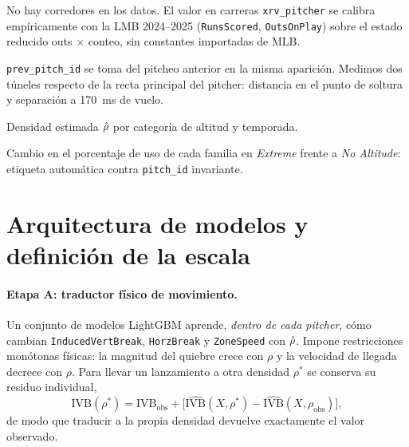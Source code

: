 \documentclass[10pt]{article}
\begin{document}
\begin{description}[leftmargin=0pt]
  \item[24 estados base-out $\to$ outs $\times$ conteo.] No hay corredores en los datos. El valor en carreras \texttt{xrv\_pitcher} se calibra empíricamente con la LMB 2024--2025 (\texttt{RunsScored}, \texttt{OutsOnPlay}) sobre el estado reducido outs $\times$ conteo, sin constantes importadas de MLB.
  \item[Secuencia y túnel.] \texttt{prev\_pitch\_id} se toma del pitcheo anterior en la misma aparición. Medimos dos túneles respecto de la recta principal del pitcher: distancia en el punto de soltura y separación a 170~ms de vuelo.
\end{description}

\begin{table}[htbp]\centering\small
\caption{Densidad estimada $\rhohat$ por categoría de altitud y temporada.}\label{tab:densidad}
\end{table}

\begin{table}[htbp]\centering\small
\caption{Cambio en el porcentaje de uso de cada familia en \emph{Extreme} frente a \emph{No Altitude}: etiqueta automática contra \texttt{pitch\_id} invariante.}\label{tab:reetiquetado}
\end{table}

\section{Arquitectura de modelos y definición de la escala}
\label{sec:modelos}

\paragraph{Etapa A: traductor físico de movimiento.} Un conjunto de modelos LightGBM aprende, \emph{dentro de cada pitcher}, cómo cambian \texttt{InducedVertBreak}, \texttt{HorzBreak} y \texttt{ZoneSpeed} con $\rhohat$. Impone restricciones monótonas físicas: la magnitud del quiebre crece con $\rho$ y la velocidad de llegada decrece con $\rho$. Para llevar un lanzamiento a otra densidad $\rho^*$ se conserva su residuo individual,
\[
\text{IVB}(\rho^*) = \text{IVB}_{\text{obs}} + \big[\widehat{\text{IVB}}(X,\rho^*) - \widehat{\text{IVB}}(X,\rho_{\text{obs}})\big],
\]
de modo que traducir a la propia densidad devuelve exactamente el valor observado.
\end{document}
